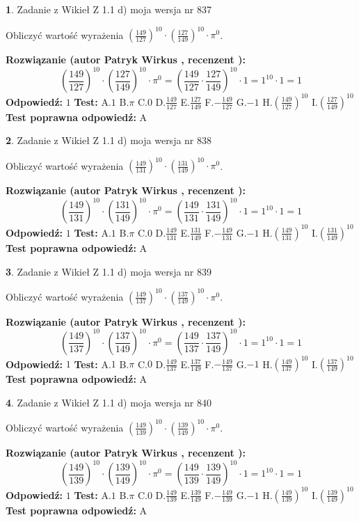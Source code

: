 \documentclass[12pt, a4paper]{article}
\theoremstyle{definition} %
\newtheorem{zad}{}
\newcommand{\zadStart}[1]{\begin{zad}#1\newline}
\newcommand{\zadStop}{\end{zad}}
\newcommand{\rozwStart}[2]{\noindent \textbf{Rozwiązanie (autor #1 , recenzent #2): }\newline}
\newcommand{\rozwStop}{\newline}
\newcommand{\odpStart}{\noindent \textbf{Odpowiedź:}\newline}
\newcommand{\odpStop}{\newline}
\newcommand{\testStart}{\noindent \textbf{Test:}\newline}
\newcommand{\testStop}{\newline}
\newcommand{\kluczStart}{\noindent \textbf{Test poprawna odpowiedź:}\newline}
\newcommand{\kluczStop}{\newline}
\begin{document}
\zadStart{Zadanie z Wikieł Z 1.1 d) moja wersja nr 837}

Obliczyć wartość wyrażenia $(\frac{149}{127})^{10} \cdot (\frac{127}{149})^{10} \cdot \pi^{0}$.
\zadStop
\rozwStart{Patryk Wirkus}{}
$$(\frac{149}{127})^{10} \cdot (\frac{127}{149})^{10} \cdot \pi^{0} = (\frac{149}{127} \cdot \frac{127}{149})^{10} \cdot 1 = 1^{10} \cdot 1 = 1$$
\rozwStop
\odpStart
$1$
\odpStop
\testStart
A.$1$ B.$\pi$ C.$0$ D.$\frac{149}{127}$ E.$\frac{127}{149}$
F.$-\frac{149}{127}$ G.$-1$
H.$(\frac{149}{127})^{10}$
I.$(\frac{127}{149})^{10}$
\testStop
\kluczStart
A
\kluczStop



\zadStart{Zadanie z Wikieł Z 1.1 d) moja wersja nr 838}

Obliczyć wartość wyrażenia $(\frac{149}{131})^{10} \cdot (\frac{131}{149})^{10} \cdot \pi^{0}$.
\zadStop
\rozwStart{Patryk Wirkus}{}
$$(\frac{149}{131})^{10} \cdot (\frac{131}{149})^{10} \cdot \pi^{0} = (\frac{149}{131} \cdot \frac{131}{149})^{10} \cdot 1 = 1^{10} \cdot 1 = 1$$
\rozwStop
\odpStart
$1$
\odpStop
\testStart
A.$1$ B.$\pi$ C.$0$ D.$\frac{149}{131}$ E.$\frac{131}{149}$
F.$-\frac{149}{131}$ G.$-1$
H.$(\frac{149}{131})^{10}$
I.$(\frac{131}{149})^{10}$
\testStop
\kluczStart
A
\kluczStop



\zadStart{Zadanie z Wikieł Z 1.1 d) moja wersja nr 839}

Obliczyć wartość wyrażenia $(\frac{149}{137})^{10} \cdot (\frac{137}{149})^{10} \cdot \pi^{0}$.
\zadStop
\rozwStart{Patryk Wirkus}{}
$$(\frac{149}{137})^{10} \cdot (\frac{137}{149})^{10} \cdot \pi^{0} = (\frac{149}{137} \cdot \frac{137}{149})^{10} \cdot 1 = 1^{10} \cdot 1 = 1$$
\rozwStop
\odpStart
$1$
\odpStop
\testStart
A.$1$ B.$\pi$ C.$0$ D.$\frac{149}{137}$ E.$\frac{137}{149}$
F.$-\frac{149}{137}$ G.$-1$
H.$(\frac{149}{137})^{10}$
I.$(\frac{137}{149})^{10}$
\testStop
\kluczStart
A
\kluczStop



\zadStart{Zadanie z Wikieł Z 1.1 d) moja wersja nr 840}

Obliczyć wartość wyrażenia $(\frac{149}{139})^{10} \cdot (\frac{139}{149})^{10} \cdot \pi^{0}$.
\zadStop
\rozwStart{Patryk Wirkus}{}
$$(\frac{149}{139})^{10} \cdot (\frac{139}{149})^{10} \cdot \pi^{0} = (\frac{149}{139} \cdot \frac{139}{149})^{10} \cdot 1 = 1^{10} \cdot 1 = 1$$
\rozwStop
\odpStart
$1$
\odpStop
\testStart
A.$1$ B.$\pi$ C.$0$ D.$\frac{149}{139}$ E.$\frac{139}{149}$
F.$-\frac{149}{139}$ G.$-1$
H.$(\frac{149}{139})^{10}$
I.$(\frac{139}{149})^{10}$
\testStop
\kluczStart
A
\kluczStop
\end{document}
